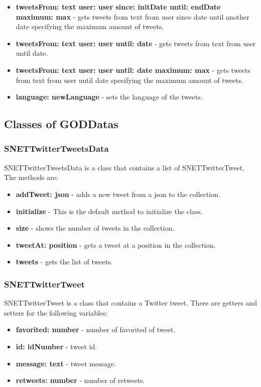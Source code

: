 \begin{itemize}
\item \textbf{tweetsFrom: text user: user since: initDate until: endDate maximum: max} - gets tweets from text from user since date until another date specifying the maximum amount of tweets.
\item \textbf{tweetsFrom: text user: user until: date} - gets tweets from text from user until date.
\item \textbf{tweetsFrom: text user: user until: date maximum: max} - gets tweets from text from user until date specifying the maximum amount of tweets.
\item \textbf{language: newLanguage} - sets the language of the tweets.
\end{itemize}

\subsection{Classes of GODDatas}
\label{sec-1-5}
\subsubsection{SNETTwitterTweetsData}
\label{sec-1-5-1}
SNETTwitterTweetsData is a class that contains a list of SNETTwitterTweet. The methods are:
\begin{itemize}
\item \textbf{addTweet: json} - adds a new tweet from a json to the collection.
\item \textbf{initialize} - This is the default method to initialize the class.
\item \textbf{size} - shows the number of tweets in the collection.
\item \textbf{tweetAt: position} - gets a tweet at a position in the collection.
\item \textbf{tweets} - gets the list of tweets.
\end{itemize}

\subsubsection{SNETTwitterTweet}
\label{sec-1-5-2}
SNETTwitterTweet is a class that contains a Twitter tweet. There are getters and setters for the following variables:
\begin{itemize}
\item \textbf{favorited: number} - number of favorited of tweet.
\item \textbf{id: idNumber} - tweet id.
\item \textbf{message: text} - tweet message.
\item \textbf{retweets: number} - number of retweets.
\end{itemize}

